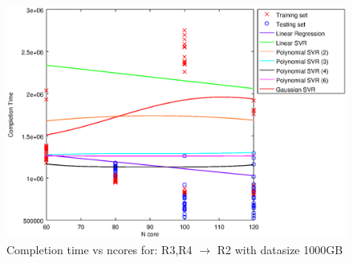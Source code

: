 
\begin {figure}[hbtp]
\centering
\includegraphics[width=\textwidth]{output/R3_R4_VS_R2_1000_ALL_FEATURES/plot_R3_R4_VS_R2_1000.eps}
\caption{Completion time vs ncores for: R3,R4 $\rightarrow$ R2 with datasize 1000GB}
\label{fig:coreonly_linear_R3,R4_R2_1000}
\end {figure}
